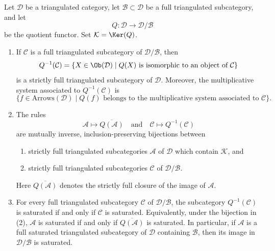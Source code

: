 \begin{lemma}
\label{lemma-subcategories-of-quotient}
Let $\mathcal{D}$ be a triangulated category, let
$\mathcal{B} \subset \mathcal{D}$ be a full triangulated subcategory,
and let
$$
Q : \mathcal{D} \longrightarrow \mathcal{D}/\mathcal{B}
$$
be the quotient functor. Set $\mathcal{K}=\Ker(Q)$.
\begin{enumerate}
\item If $\mathcal{C}$ is a full triangulated subcategory of
$\mathcal{D}/\mathcal{B}$, then
$$
Q^{-1}(\mathcal{C})=
\{X\in\Ob(\mathcal{D})\mid Q(X)\text{ is isomorphic to an object of }
\mathcal{C}\}
$$
is a strictly full triangulated subcategory of $\mathcal{D}$. Moreover,
the multiplicative system associated to $Q^{-1}(\mathcal{C})$ is
$$
\{f\in\text{Arrows}(\mathcal{D})\mid
Q(f)\text{ belongs to the multiplicative system associated to }
\mathcal{C}\}.
$$
\item The rules
$$
\mathcal{A}\longmapsto \overline{Q(\mathcal{A})}
\quad\text{and}\quad
\mathcal{C}\longmapsto Q^{-1}(\mathcal{C})
$$
are mutually inverse, inclusion-preserving bijections between
\begin{enumerate}
\item strictly full triangulated subcategories $\mathcal{A}$ of
$\mathcal{D}$ which contain $\mathcal{K}$, and
\item strictly full triangulated subcategories $\mathcal{C}$ of
$\mathcal{D}/\mathcal{B}$.
\end{enumerate}
Here $\overline{Q(\mathcal{A})}$ denotes the strictly full closure of the
image of $\mathcal{A}$.
\item For every full triangulated subcategory $\mathcal{C}$ of
$\mathcal{D}/\mathcal{B}$, the subcategory $Q^{-1}(\mathcal{C})$ is
saturated if and only if $\mathcal{C}$ is saturated. Equivalently, under
the bijection in (2), $\mathcal{A}$ is saturated if and only if
$\overline{Q(\mathcal{A})}$ is saturated. In particular, if
$\mathcal{A}$ is a full saturated triangulated subcategory of
$\mathcal{D}$ containing $\mathcal{B}$, then its image in
$\mathcal{D}/\mathcal{B}$ is saturated.
\end{enumerate}
\end{lemma}

